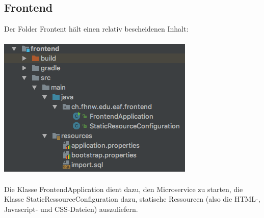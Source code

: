 \documentclass[11pt]{article} %
\begin{document}
\subsection{Frontend}
Der Folder Frontent hält einen relativ bescheidenen Inhalt:
\\
\\
\includegraphics[scale=0.7]{structure_frontend}
\\
\\
Die Klasse FrontendApplication dient dazu, den Microservice zu starten, die Klasse StaticRessourceConfiguration dazu, statische Ressourcen (also die HTML-, Javascript- und CSS-Dateien) auszuliefern.
\end{document}

